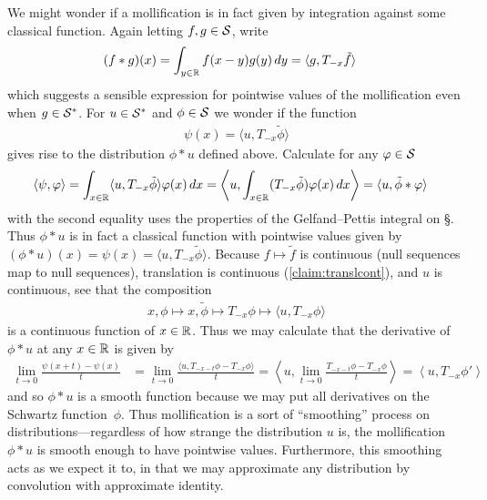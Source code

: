     We might wonder if a mollification is in fact given by integration against some classical function.
    Again letting $f,g\in\S$, write
    \begin{align*}
      (f*g)(x)
      &= \int_{y\in\R} f(x-y)g(y)\,dy
      = \langle g, T_{-x}\tilde f\rangle
    \end{align*}
    which suggests a sensible expression for pointwise values of the mollification even when $g\in\SS$.
    For $u\in\SS$ and $\phi\in\S$ we wonder if the function
    \begin{align*}
      \psi(x) = \langle u, T_{-x}\tilde\phi\rangle
    \end{align*}
    gives rise to the distribution $\phi*u$ defined above.
    Calculate for any $\varphi\in\S$
    \begin{align*}
      \left\langle \psi, \varphi \right\rangle
      &= \int_{x\in\R} \langle u,T_{-x}\tilde\phi\rangle\varphi(x)\,dx
      = \left\langle u, \int_{x\in\R} (T_{-x}\tilde\phi)\varphi(x)\,dx \right\rangle
      = \langle u, \tilde\phi*\varphi\rangle
    \end{align*}
    with the second equality uses the properties of the Gelfand--Pettis integral on \S. 
    Thus $\phi*u$ is in fact a classical function with pointwise values given by $(\phi*u)(x)=\psi(x)=\langle u, T_{-x}\tilde\phi\rangle$.
    Because $f\mapsto\tilde f$ is continuous (null sequences map to null sequences), translation is continuous (\cref{claim:translcont}), and $u$ is continuous, see that the composition
    \begin{align*}
      x, \phi \mapsto x, \tilde\phi \mapsto T_{-x}\phi \mapsto \langle u, T_{-x}\phi \rangle
    \end{align*}
    is a continuous function of $x\in\R$.
    Thus we may calculate that the derivative of $\phi*u$ at any $x\in\R$ is given by
    \begin{align*}
      \lim_{t\rightarrow0} \frac{\psi(x+t) - \psi(x)}{t}
      &= \lim_{t\rightarrow0} \frac{\langle u, T_{-x-t}\phi-T_{-x}\phi\rangle}{t}
      = \left\langle u, \lim_{t\rightarrow0} \frac{T_{-x-t}\phi-T_{-x}\phi}{t}\right\rangle
      = \left\langle u, T_{-x}\phi'\right\rangle
    \end{align*}
    and so $\phi*u$ is a smooth function because we may put all derivatives on the Schwartz function~$\phi$.
    Thus mollification is a sort of ``smoothing'' process on distributions---regardless of how strange the distribution $u$ is, the mollification $\phi*u$ is smooth enough to have pointwise values.
    Furthermore, this smoothing acts as we expect it to, in that we may approximate any distribution by convolution with approximate identity. 

